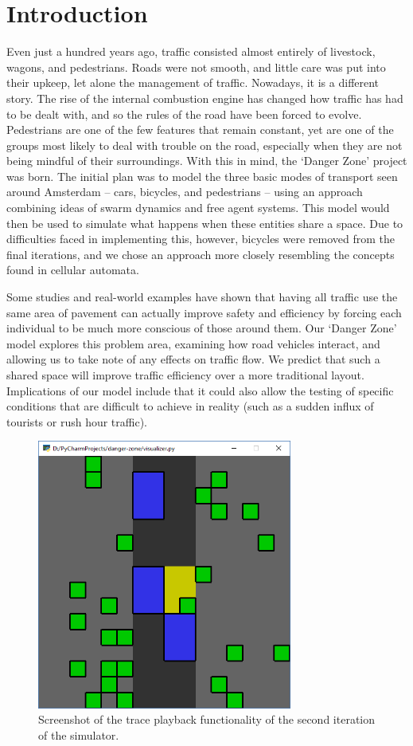 \chapter{Introduction} \label{chap:introduction}

Even just a hundred years ago, traffic consisted almost entirely of livestock, wagons, and pedestrians. Roads were not smooth, and little care was put into their upkeep, let alone the management of traffic. Nowadays, it is a different story. The rise of the internal combustion engine has changed how traffic has had to be dealt with, and so the rules of the road have been forced to evolve. Pedestrians are one of the few features that remain constant, yet are one of the groups most likely to deal with trouble on the road, especially when they are not being mindful of their surroundings. With this in mind, the `Danger Zone' project was born. The initial plan was to model the three basic modes of transport seen around Amsterdam – cars, bicycles, and pedestrians – using an approach combining ideas of swarm dynamics and free agent systems. This model would then be used to simulate what happens when these entities share a space. Due to difficulties faced in implementing this, however, bicycles were removed from the final iterations, and we chose an approach more closely resembling the concepts found in cellular automata.

Some studies and real-world examples\cite{hamilton2008}\cite{clarke2006}\cite{kruyswijk2016} have shown that having all traffic use the same area of pavement can actually improve safety and efficiency by forcing each individual to be much more conscious of those around them. Our `Danger Zone' model explores this problem area, examining how road vehicles interact, and allowing us to take note of any effects on traffic flow. We predict that such a shared space will improve traffic efficiency over a more traditional layout. Implications of our model include that it could also allow the testing of specific conditions that are difficult to achieve in reality (such as a sudden influx of tourists or rush hour traffic).

\begin{figure}[h]
    \centering
    \includegraphics[width=3.3in]{images/screenshot-discrete.png}
    \caption{Screenshot of the trace playback functionality of the second iteration of the simulator.}
    \label{fig:screenshot-discrete}
\end{figure}
